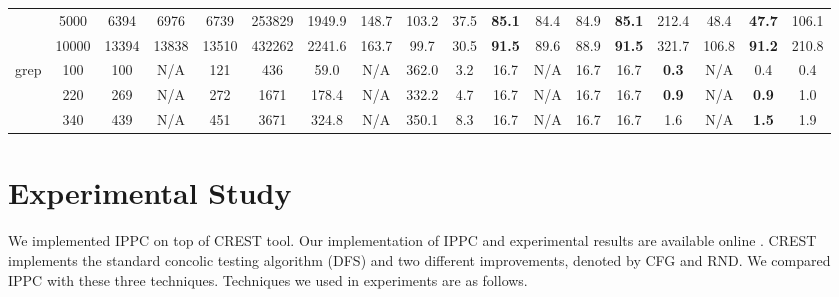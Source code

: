 \documentclass[EPiCempty]{easychair}
\begin{document}
\begin{table}
\begin{scriptsize}
\begin{tabular}{|c|c|cccc|cccc|cccc|cccc|}
                            &         5000                &   6394     &    6976    &   6739     &    253829     &    1949.9      &   148.7     &    103.2     &    37.5   & \textbf{85.1}     &     84.4     &     84.9   &   \textbf{85.1}       &     212.4     &    48.4     &   \textbf{47.7}   &  106.1  \\
                            &         10000               &    13394    &    13838    &    13510    &    432262     &    2241.6     &    163.7    &    99.7    &     30.5    &    \textbf{91.5}    &    89.6    &    88.9     &    \textbf{91.5}      &     321.7     &    106.8     &   \textbf{91.2}   &  210.8  \\
\hline
\multirow{3}{*}{grep}       &          100               &    100    &   N/A     &   121     &    436     &    59.0     &    N/A    &    362.0    &    3.2     &  16.7    &    N/A    &    16.7    &    16.7     &     \textbf{0.3}     &     N/A     &    0.4     &    0.4      \\
                            &          220               &    269    &   N/A     &   272     &    1671     &    178.4     &   N/A     &   332.2     &    4.7     &    16.7     &    N/A    &    16.7    &    16.7     &     \textbf{0.9}     &     N/A     &    \textbf{0.9}    &     1.0     \\
                            &          340               &    439    &   N/A     &   451     &    3671     &    324.8     &   N/A     &    350.1    &    8.3     &    16.7     &    N/A    &     16.7   &     16.7    &     1.6     &     N/A     &    \textbf{1.5}     &    1.9     \\
\hline
\end{tabular}\label{tbl:allresults}
\end{scriptsize}

\end{table}

\section{Experimental Study}
\label{sec:experiments}

We implemented IPPC on top of CREST tool. Our implementation of IPPC and experimental results are available online \cite{website:crestppc}. CREST implements the standard concolic testing algorithm (DFS) and two different improvements, denoted by CFG and RND. We compared IPPC with these three techniques. Techniques we used in experiments are as follows.
\end{document}
